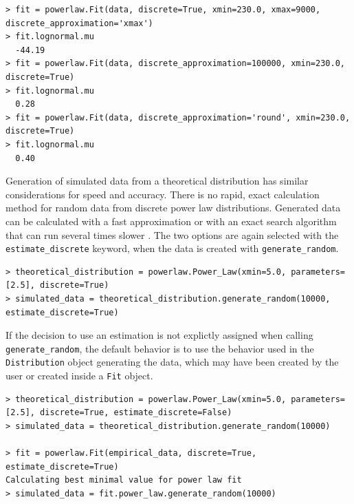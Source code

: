 \documentclass[10pt]{article}
\begin{document}
\begin{verbatim}
> fit = powerlaw.Fit(data, discrete=True, xmin=230.0, xmax=9000, discrete_approximation='xmax')
> fit.lognormal.mu
  -44.19
> fit = powerlaw.Fit(data, discrete_approximation=100000, xmin=230.0, discrete=True)
> fit.lognormal.mu
  0.28
> fit = powerlaw.Fit(data, discrete_approximation='round', xmin=230.0, discrete=True)
> fit.lognormal.mu
  0.40
\end{verbatim}

Generation of simulated data from a theoretical distribution has similar considerations for speed and accuracy. There is no rapid, exact calculation method for random data from discrete power law distributions. Generated data can be calculated with a fast approximation or with an exact search algorithm that can run several times slower \cite{Clauset2009}. The two options are again selected with the \verb$estimate_discrete$ keyword, when the data is created with \verb$generate_random$. 

\begin{verbatim}
> theoretical_distribution = powerlaw.Power_Law(xmin=5.0, parameters=[2.5], discrete=True)
> simulated_data = theoretical_distribution.generate_random(10000, estimate_discrete=True)
\end{verbatim}

If the decision to use an estimation is not explictly assigned when calling \verb$generate_random$, the default behavior is to use the behavior used in the \verb$Distribution$ object generating the data, which may have been created by the user or created inside a \verb$Fit$ object.

\begin{verbatim}
> theoretical_distribution = powerlaw.Power_Law(xmin=5.0, parameters=[2.5], discrete=True, estimate_discrete=False)
> simulated_data = theoretical_distribution.generate_random(10000)

> fit = powerlaw.Fit(empirical_data, discrete=True, estimate_discrete=True)
Calculating best minimal value for power law fit
> simulated_data = fit.power_law.generate_random(10000)
\end{verbatim}
\end{document}
